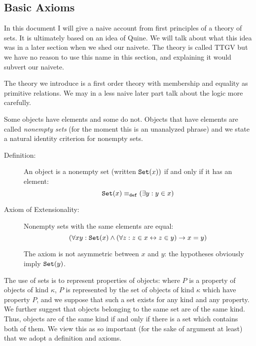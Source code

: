 \documentclass[12pt]{article}
\begin{document}
\subsection{Basic Axioms}

In this document I will give a naive account from first principles of a theory of sets.  It is ultimately based on an idea of Quine.  We will talk about what this idea was in a later section when we shed our naivete.  The theory is called TTGV but we have no reason to use this name in this section, and explaining it would subvert our naivete.

The theory we introduce is a first order theory with membership and equality as primitive relations.  We may in a less naive later part talk about the logic more carefully.

Some objects have elements and some do not.  Objects that have elements are called {\em nonempty sets\/} (for the moment this is an unanalyzed phrase) and we state a natural identity criterion for nonempty sets.

\begin{description}

\item[Definition:]  An object is a nonempty set (written ${\tt Set}(x))$ if and only if it has an element:  $${\tt Set}(x) \equiv_{\tt def} (\exists y:y \in x)$$

\item[Axiom of Extensionality:]  Nonempty sets with the same elements are equal:  $$(\forall xy:{\tt Set}(x) \wedge(\forall z:z \in x \leftrightarrow z \in y) \rightarrow x=y)$$

The axiom is not asymmetric between $x$ and $y$:  the hypotheses obviously imply ${\tt Set}(y)$.

\end{description}

The use of sets is to represent properties of objects:  where $P$ is a property of objects of kind $\kappa$, $P$ is represented by the set of objects of kind $\kappa$
which have property $P$, and we suppose that such a set exists for any kind and any property.  We further suggest that objects belonging to the same set are of the same kind.  Thus, objects are of the same kind if and only if there is a set which contains both of them.  We view this as so important (for the sake of argument 
at least) that we adopt a definition and axioms.
\end{document}
